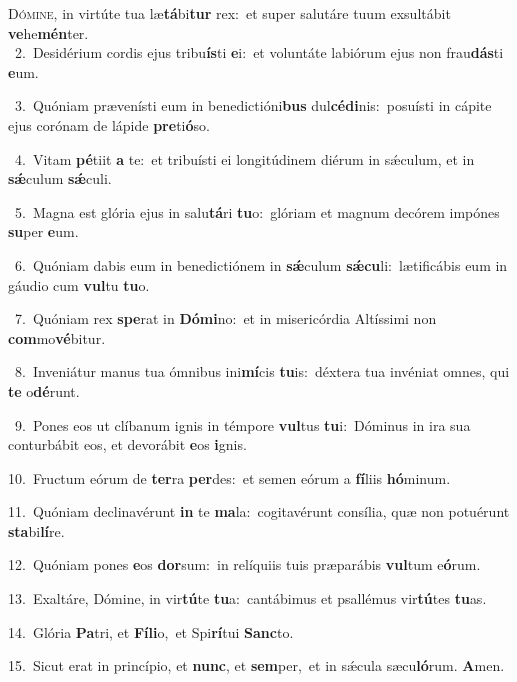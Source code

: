 \lettrine{\initial\textcolor{\initialcolor}{D}}{ómine,} in virtúte tua læ\-\textbf{tá}\-bi\textbf{tur} rex:~\star et super salutáre tuum exsultábit \textbf{ve}\-he\-\textbf{mén}\-ter.\\
{\numbfont\textcolor{\numbcolor}{~2.}}~Desidérium cordis ejus tribu\-\textbf{ís}\-ti \textbf{e}\-i:~\star et voluntáte labiórum ejus non frau\-\textbf{dás}\-ti \textbf{e}\-um.\par
{\numbfont\textcolor{\numbcolor}{~3.}}~Quóniam prævenísti eum in benedictióni\textbf{bus} dul\-\textbf{cé}\-\textbf{di}nis:~\star posuísti in cápite ejus corónam de lápide \textbf{pre}\-ti\-\textbf{ó}\-so.\par
{\numbfont\textcolor{\numbcolor}{~4.}}~Vitam \textbf{pé}\-tiit \textbf{a} te:~\star et tribuísti ei longitúdinem diérum in sǽculum, et in \textbf{sǽ}\-culum \textbf{sǽ}\-culi.\par
{\numbfont\textcolor{\numbcolor}{~5.}}~Magna est glória ejus in salu\-\textbf{tá}\-ri \textbf{tu}\-o:~\star glóriam et magnum decórem impónes \textbf{su}\-per \textbf{e}\-um.\par
{\numbfont\textcolor{\numbcolor}{~6.}}~Quóniam dabis eum in benedictiónem in \textbf{sǽ}\-culum \textbf{sǽ}\-\textbf{cu}li:~\star lætificábis eum in gáudio cum \textbf{vul}\-tu \textbf{tu}\-o.\par
{\numbfont\textcolor{\numbcolor}{~7.}}~Quóniam rex \textbf{spe}\-rat in \textbf{Dó}\-\textbf{mi}no:~\star et in misericórdia Altíssimi non \textbf{com}\-mo\-\textbf{vé}\-bitur.\par
{\numbfont\textcolor{\numbcolor}{~8.}}~Inveniátur manus tua ómnibus ini\-\textbf{mí}\-cis \textbf{tu}\-is:~\star déxtera tua invéniat omnes, qui \textbf{te} o\-\textbf{dé}\-runt.\par
{\numbfont\textcolor{\numbcolor}{~9.}}~Pones eos ut clíbanum ignis in témpore \textbf{vul}\-tus \textbf{tu}\-i:~\star Dóminus in ira sua conturbábit eos, et devorábit \textbf{e}\-os \textbf{i}\-gnis.\par
{\numbfont\textcolor{\numbcolor}{10.}}~Fructum eórum de \textbf{ter}\-ra \textbf{per}\-des:~\star et semen eórum a \textbf{fí}\-liis \textbf{hó}\-minum.\par
{\numbfont\textcolor{\numbcolor}{11.}}~Quóniam declinavérunt \textbf{in} te \textbf{ma}\-la:~\star cogitavérunt consília, quæ non potuérunt \textbf{sta}\-bi\-\textbf{lí}\-re.\par
{\numbfont\textcolor{\numbcolor}{12.}}~Quóniam pones \textbf{e}\-os \textbf{dor}\-sum:~\star in relíquiis tuis præparábis \textbf{vul}\-tum e\-\textbf{ó}\-rum.\par
{\numbfont\textcolor{\numbcolor}{13.}}~Exaltáre, Dómine, in vir\-\textbf{tú}\-te \textbf{tu}\-a:~\star cantábimus et psallémus vir\-\textbf{tú}\-tes \textbf{tu}\-as.\par
{\numbfont\textcolor{\numbcolor}{14.}}~Glória \textbf{Pa}\-tri, et \textbf{Fí}\-\textbf{li}o,~\star et Spi\-\textbf{rí}\-tui \textbf{Sanc}\-to.\par
{\numbfont\textcolor{\numbcolor}{15.}}~Sicut erat in princípio, et \textbf{nunc}\-, et \textbf{sem}\-per,~\star et in sǽcula sæcu\-\textbf{ló}\-rum. \textbf{A}\-men.\par
